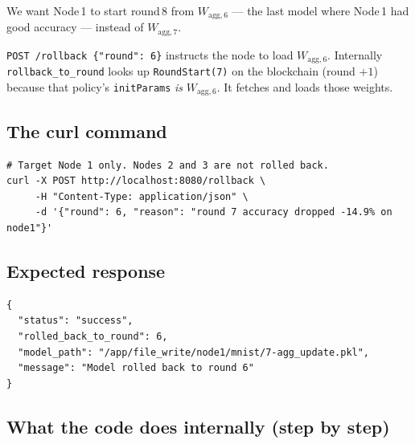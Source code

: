\documentclass[11pt,a4paper]{article}
\newcommand{\Wagg}[1]{$W_{\text{agg},#1}$}
\begin{document}
We want Node\,1 to start round\,8 from \Wagg{6} --- the last model where
Node\,1 had good accuracy --- instead of \Wagg{7}.

\begin{tcolorbox}[infobox={Why round 6?}]
  \texttt{POST /rollback \{"round": 6\}} instructs the node to load
  \Wagg{6}.  Internally \texttt{rollback\_to\_round} looks up
  \texttt{RoundStart(7)} on the blockchain (round $+ 1$) because that
  policy's \texttt{initParams} \emph{is} \Wagg{6}.  It fetches and loads
  those weights.
\end{tcolorbox}

\subsection{The curl command}

\begin{lstlisting}[style=bash]
# Target Node 1 only. Nodes 2 and 3 are not rolled back.
curl -X POST http://localhost:8080/rollback \
     -H "Content-Type: application/json" \
     -d '{"round": 6, "reason": "round 7 accuracy dropped -14.9% on node1"}'
\end{lstlisting}

\subsection{Expected response}

\begin{lstlisting}[style=json]
{
  "status": "success",
  "rolled_back_to_round": 6,
  "model_path": "/app/file_write/node1/mnist/7-agg_update.pkl",
  "message": "Model rolled back to round 6"
}
\end{lstlisting}

\subsection{What the code does internally (step by step)}
\end{document}
